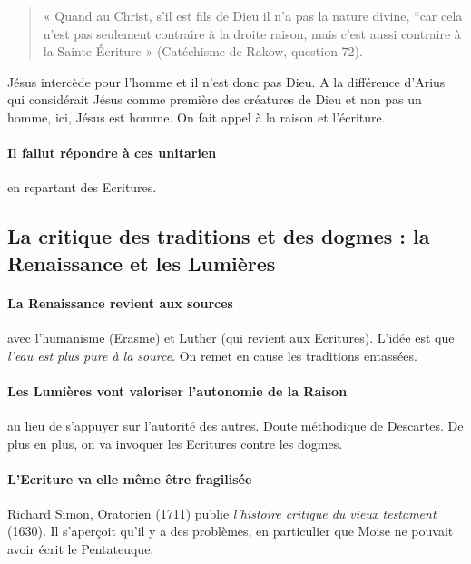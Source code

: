 \begin{quote}
    « Quand au Christ, s’il est fils de Dieu il n’a pas la nature divine, “car cela n’est pas seulement contraire à la droite raison, mais c’est aussi contraire à la Sainte Écriture » (Catéchisme de Rakow, question 72).
\end{quote}

Jésus intercède pour l'homme et il n'est donc pas Dieu. A la différence d'Arius qui considérait Jésus comme première des créatures de Dieu et non pas un homme, ici, Jésus est homme. On fait appel à la raison et l'écriture.

\paragraph{Il fallut répondre à ces unitarien} en repartant des Ecritures.




\subsection{La critique des traditions et des dogmes : la Renaissance et les Lumières} 


\paragraph{La Renaissance revient aux sources} avec l'humanisme (Erasme) et Luther (qui revient aux Ecritures). L'idée est que \textit{l'eau est plus pure à la source}. On remet en cause les traditions entassées.

\paragraph{Les Lumières vont valoriser l'autonomie de la Raison} au lieu de s'appuyer sur l'autorité des autres. Doute méthodique de Descartes.  De plus en plus, on va invoquer les Ecritures contre les dogmes.


\paragraph{L'Ecriture va elle même être fragilisée} Richard Simon, Oratorien (1711) publie \textit{l'histoire critique du vieux testament} (1630). Il s'aperçoit qu'il y a des problèmes, en particulier que Moise ne pouvait avoir écrit le Pentateuque. 






